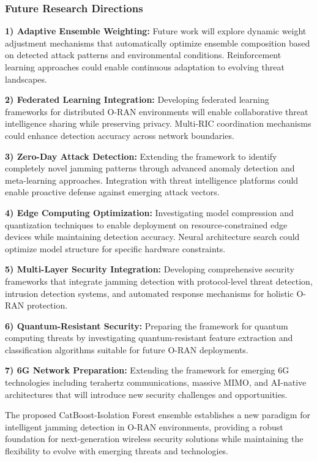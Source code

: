 \documentclass[journal]{IEEEtran}
\begin{document}
\subsubsection{Future Research Directions}

\textbf{1) Adaptive Ensemble Weighting:} Future work will explore dynamic weight adjustment mechanisms that automatically optimize ensemble composition based on detected attack patterns and environmental conditions. Reinforcement learning approaches could enable continuous adaptation to evolving threat landscapes.

\textbf{2) Federated Learning Integration:} Developing federated learning frameworks for distributed O-RAN environments will enable collaborative threat intelligence sharing while preserving privacy. Multi-RIC coordination mechanisms could enhance detection accuracy across network boundaries.

\textbf{3) Zero-Day Attack Detection:} Extending the framework to identify completely novel jamming patterns through advanced anomaly detection and meta-learning approaches. Integration with threat intelligence platforms could enable proactive defense against emerging attack vectors.

\textbf{4) Edge Computing Optimization:} Investigating model compression and quantization techniques to enable deployment on resource-constrained edge devices while maintaining detection accuracy. Neural architecture search could optimize model structure for specific hardware constraints.

\textbf{5) Multi-Layer Security Integration:} Developing comprehensive security frameworks that integrate jamming detection with protocol-level threat detection, intrusion detection systems, and automated response mechanisms for holistic O-RAN protection.

\textbf{6) Quantum-Resistant Security:} Preparing the framework for quantum computing threats by investigating quantum-resistant feature extraction and classification algorithms suitable for future O-RAN deployments.

\textbf{7) 6G Network Preparation:} Extending the framework for emerging 6G technologies including terahertz communications, massive MIMO, and AI-native architectures that will introduce new security challenges and opportunities.

The proposed CatBoost-Isolation Forest ensemble establishes a new paradigm for intelligent jamming detection in O-RAN environments, providing a robust foundation for next-generation wireless security solutions while maintaining the flexibility to evolve with emerging threats and technologies.
\end{document}
